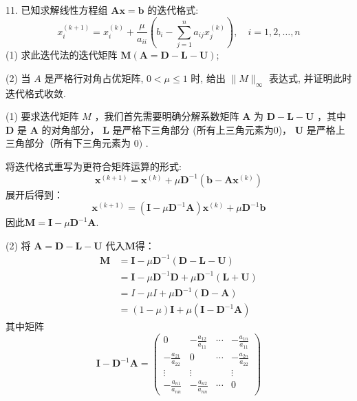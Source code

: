 \begin{tcolorbox}[breakable,enhanced,arc=0mm,outer arc=0mm,
		boxrule=0pt,toprule=1pt,leftrule=0pt,bottomrule=1pt, rightrule=0pt,left=0.2cm,right=0.2cm,
		titlerule=0.5em,toptitle=0.1cm,bottomtitle=-0.1cm,top=0.2cm,
		colframe=white!10!biru,colback=white!90!biru,coltitle=white,
            coltext=black,title =2024-04, title style={white!10!biru}, before skip=8pt, after skip=8pt,before upper=\hspace{2em},
		fonttitle=\bfseries,fontupper=\normalsize]
  
11. 已知求解线性方程组 $ \boldsymbol{A x}=\boldsymbol{b} $ 的迭代格式:
$$
x_{i}^{(k+1)}=x_{i}^{(k)}+\frac{\mu}{a_{i i}}\left(b_{i}-\sum_{j=1}^{n} a_{i j} x_{j}^{(k)}\right), \quad i=1,2, \ldots, n
$$
(1) 求此迭代法的迭代矩阵 $ \boldsymbol{M}(\boldsymbol{A}=\boldsymbol{D}-\boldsymbol{L}-\boldsymbol{U}) $; 

(2) 当 $ A $ 是严格行对角占优矩阵, $ 0<\mu \leq 1 $ 时, 给出 $ \|M\|_{\infty} $ 表达式, 并证明此时迭代格式收敛.
\tcblower

(1) 要求迭代矩阵 $ M $ ，我们首先需要明确分解系数矩阵 $ \boldsymbol{A} $ 为 $ \boldsymbol{D}-\boldsymbol{L}-\boldsymbol{U} $ ，其中 $ \boldsymbol{D} $ 是 $ \boldsymbol{A} $ 的对角部分， $ \boldsymbol{L} $ 是严格下三角部分 (所有上三角元素为0)， $ \boldsymbol{U} $ 是严格上三角部分（所有下三角元素为 $ 0) $ .

将迭代格式重写为更符合矩阵运算的形式:
$$
\boldsymbol{x}^{(k+1)}=\boldsymbol{x}^{(k)}+\mu \boldsymbol{D}^{-1}\left(\boldsymbol{b}-\boldsymbol{A} \boldsymbol{x}^{(k)}\right)
$$
展开后得到：
$$
\boldsymbol{x}^{(k+1)}=(\boldsymbol{I}-\mu \boldsymbol{D}^{-1}\boldsymbol{A})\boldsymbol{x}^{(k)}+\mu \boldsymbol{D}^{-1}\boldsymbol{b}
$$
因此$\boldsymbol{M}=\boldsymbol{I}-\mu \boldsymbol{D}^{-1}\boldsymbol{A}$.


(2) 将 $ \boldsymbol{A}=\boldsymbol{D}-\boldsymbol{L}-\boldsymbol{U} $ 代入$\boldsymbol{M}$得：
$$
\begin{aligned}
\boldsymbol{M}&=\boldsymbol{I}-\mu \boldsymbol{D}^{-1}(\boldsymbol{D}-\boldsymbol{L}-\boldsymbol{U}) \\
&=\boldsymbol{I}-\mu \boldsymbol{D}^{-1} \boldsymbol{D}+\mu \boldsymbol{D}^{-1}(\boldsymbol{L}+\boldsymbol{U})\\
&=I-\mu I+\mu \boldsymbol{D}^{-1}(\boldsymbol{D}-\boldsymbol{A}) \\
&=(1-\mu) \boldsymbol{I}+\mu( \boldsymbol{I}-\boldsymbol{D}^{-1}\boldsymbol{A}) 
\end{aligned}
$$
其中矩阵
$$
\boldsymbol{I}-\boldsymbol{D}^{-1} \boldsymbol{A}=\left(\begin{array}{cccc}
0 & -\frac{a_{12}}{a_{11}} & \cdots & -\frac{a_{1 n}}{a_{11}} \\
-\frac{a_{21}}{a_{22}} & 0 & \cdots & -\frac{a_{2 n}}{a_{22}} \\
\vdots & \vdots & & \vdots \\
-\frac{a_{n 1}}{a_{n n}} & -\frac{a_{n 2}}{a_{n n}} & \cdots & 0
\end{array}\right)
$$


\end{tcolorbox}
